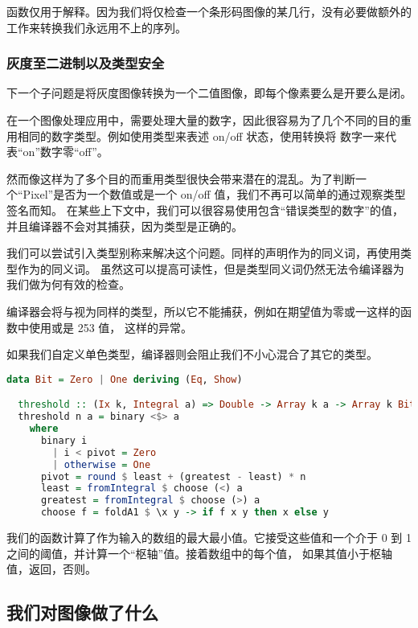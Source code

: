 \documentclass[./main.tex]{subfiles}
\begin{document}
函数仅用于解释。因为我们将仅检查一个条形码图像的某几行，没有必要做额外的工作来转换我们永远用不上的序列。

\subsubsection*{灰度至二进制以及类型安全}

下一个子问题是将灰度图像转换为一个二值图像，即每个像素要么是开要么是闭。

在一个图像处理应用中，需要处理大量的数字，因此很容易为了几个不同的目的重用相同的数字类型。例如使用类型来表述 on/off 状态，使用转换将
数字一来代表“on”数字零“off”。

然而像这样为了多个目的而重用类型很快会带来潜在的混乱。为了判断一个“Pixel”是否为一个数值或是一个 on/off 值，我们不再可以简单的通过观察类型签名而知。
在某些上下文中，我们可以很容易使用包含“错误类型的数字”的值，并且编译器不会对其捕获，因为类型是正确的。

我们可以尝试引入类型别称来解决这个问题。同样的声明作为的同义词，再使用类型作为的同义词。
虽然这可以提高可读性，但是类型同义词仍然无法令编译器为我们做为何有效的检查。

编译器会将与视为同样的类型，所以它不能捕获，例如在期望值为零或一这样的函数中使用或是 253 值，
这样的异常。

如果我们自定义单色类型，编译器则会阻止我们不小心混合了其它的类型。

\begin{lstlisting}[language=Haskell]
  data Bit = Zero | One deriving (Eq, Show)

  threshold :: (Ix k, Integral a) => Double -> Array k a -> Array k Bit
  threshold n a = binary <$> a
    where
      binary i
        | i < pivot = Zero
        | otherwise = One
      pivot = round $ least + (greatest - least) * n
      least = fromIntegral $ choose (<) a
      greatest = fromIntegral $ choose (>) a
      choose f = foldA1 $ \x y -> if f x y then x else y
\end{lstlisting}

我们的函数计算了作为输入的数组的最大最小值。它接受这些值和一个介于 0 到 1 之间的阈值，并计算一个“枢轴”值。接着数组中的每个值，
如果其值小于枢轴值，返回，否则。

\subsection*{我们对图像做了什么}
\end{document}
